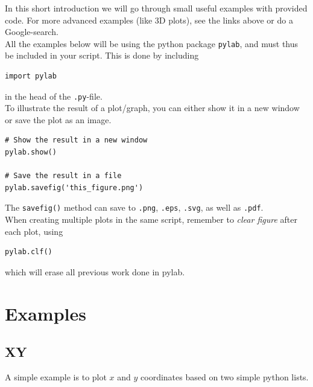 \documentclass{article}
\newcommand{\code}[1]{\texttt{#1}} %
\begin{document}
In this short introduction we will go through small useful examples with
provided code. For more advanced examples (like 3D plots), see the links above
or do a Google-search. \\

All the examples below will be using the python package \code{pylab}, and
must thus be included in your script. This is done by including

\begin{lstlisting}
import pylab
\end{lstlisting}

in the head of the \code{.py}-file.\\

To illustrate the result of a plot/graph, you can either show it in a new window or save the
plot as an image.

\begin{lstlisting}
# Show the result in a new window
pylab.show()

# Save the result in a file
pylab.savefig('this_figure.png')
\end{lstlisting}


The \code{savefig()} method can save to
\code{.png},
\code{.eps},
\code{.svg},
as well as
\code{.pdf}.\\

When creating multiple plots in the same script, remember to {\em clear figure} after each plot,
using

\begin{lstlisting}
pylab.clf()
\end{lstlisting}

which will erase all previous work done in pylab.



\newpage
\section{Examples}

\subsection{XY}

A simple example is to plot $x$ and $y$ coordinates
based on two simple python lists.
\end{document}

